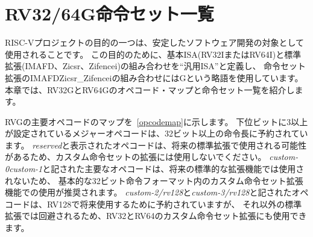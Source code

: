\begin{comment}
\chapter{RV32/64G Instruction Set Listings}
\end{comment}
\chapter{RV32/64G命令セット一覧}

\begin{comment}
One goal of the RISC-V project is that it be used as a stable software
development target.  For this purpose, we define a combination of a
base ISA (RV32I or RV64I) plus selected standard extensions (IMAFD, Zicsr, Zifencei) as
a ``general-purpose'' ISA, and we use the abbreviation G for the IMAFDZicsr\_Zifencei
combination of instruction-set extensions.    This chapter presents
opcode maps and instruction-set listings for RV32G and RV64G.
\end{comment}

RISC-Vプロジェクトの目的の一つは、安定したソフトウェア開発の対象として使用されることです。
この目的のために、基本ISA(RV32IまたはRV64I)と標準拡張(IMAFD、Zicsr、Zifencei)の組み合わせを``汎用ISA''と定義し、
命令セット拡張のIMAFDZicsr\_Zifenceiの組み合わせにはGという略語を使用しています。
本章では、RV32GとRV64Gのオペコード・マップと命令セット一覧を紹介します。



\begin{comment}
Table~\ref{opcodemap} shows a map of the major opcodes for RVG.  Major
opcodes with 3 or more lower bits set are reserved for instruction
lengths greater than 32 bits.  Opcodes marked as {\em reserved} should
be avoided for custom instruction-set extensions as they might be used
by future standard extensions.  Major opcodes marked as {\em custom-0}
and {\em custom-1} will be avoided by future standard extensions and
are recommended for use by custom instruction-set extensions within
the base 32-bit instruction format.  The opcodes marked {\em
  custom-2/rv128} and {\em custom-3/rv128} are reserved for future use
by RV128, but will otherwise be avoided for standard extensions and so
can also be used for custom instruction-set extensions in RV32 and
RV64.
\end{comment}
RVGの主要オペコードのマップを~\ref{opcodemap}に示します。
下位ビットに3以上が設定されているメジャーオペコードは、32ビット以上の命令長に予約されています。
{\em reserved}と表示されたオペコードは、将来の標準拡張で使用される可能性があるため、カスタム命令セットの拡張には使用しないでください。
{\em custom-0}{\em custom-1}と記された主要なオペコードは、将来の標準的な拡張機能では使用されないため、
基本的な32ビット命令フォーマット内のカスタム命令セット拡張機能での使用が推奨されます。
{\em custom-2/rv128}と{\em custom-3/rv128}と記されたオペコードは、RV128で将来使用するために予約されていますが、
それ以外の標準拡張では回避されるため、RV32とRV64のカスタム命令セット拡張にも使用できます。

